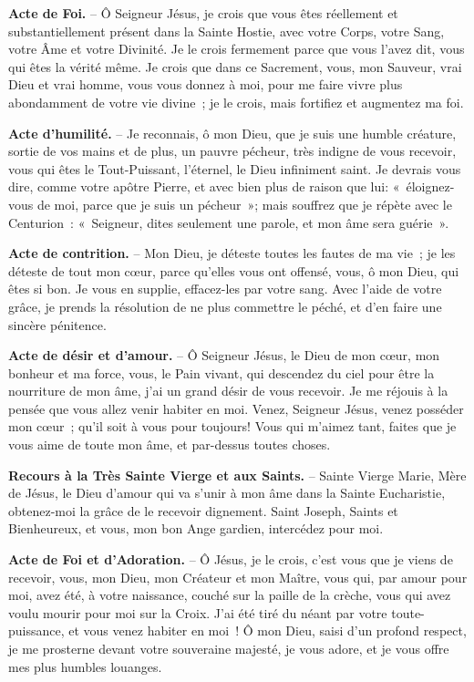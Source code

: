 \textbf{Acte de Foi.} – Ô Seigneur Jésus, je crois que vous êtes réellement et substantiellement présent dans la Sainte Hostie, avec votre Corps, votre Sang, votre Âme et votre Divinité. Je le crois fermement parce que vous l’avez dit, vous qui êtes la vérité même. Je crois que dans ce Sacrement, vous, mon Sauveur, vrai Dieu et vrai homme, vous vous donnez à moi, pour me faire vivre plus abondamment de votre vie divine~; je le crois, mais fortifiez et augmentez ma foi.

\textbf{Acte d’humilité.} – Je reconnais, ô mon Dieu, que je suis une humble créature, sortie de vos mains et de plus, un pauvre pécheur, très indigne de vous recevoir, vous qui êtes le Tout-Puissant, l’éternel, le Dieu infiniment saint. Je devrais vous dire, comme votre apôtre Pierre, et avec bien plus de raison que lui: «~éloignez-vous de moi, parce que je suis un pécheur~»; mais souffrez que je répète avec le Centurion~: «~Seigneur, dites seulement une parole, et mon âme sera guérie~».

\textbf{Acte de contrition.} – Mon Dieu, je déteste toutes les fautes de ma vie~; je les déteste de tout mon cœur, parce qu’elles vous ont offensé, vous, ô mon Dieu, qui êtes si bon. Je vous en supplie, effacez-les par votre sang. Avec l’aide de votre grâce, je prends la résolution de ne plus commettre le péché, et d’en faire une sincère pénitence.

\textbf{Acte de désir et d’amour.} – Ô Seigneur Jésus, le Dieu de mon cœur, mon bonheur et ma force, vous, le Pain vivant, qui descendez du ciel pour être la nourriture de mon âme, j’ai un grand désir de vous recevoir. Je me réjouis à la pensée que vous allez venir habiter en moi. Venez, Seigneur Jésus, venez posséder mon cœur~; qu’il soit à vous pour toujours! Vous qui m’aimez tant, faites que je vous aime de toute mon âme, et par-dessus toutes choses.

\textbf{Recours à la Très Sainte Vierge et aux Saints.} – Sainte Vierge Marie, Mère de Jésus, le Dieu d’amour qui va s’unir à mon âme dans la Sainte Eucharistie, obtenez-moi la grâce de le recevoir dignement. Saint Joseph, Saints et Bienheureux, et vous, mon bon Ange gardien, intercédez pour moi.\par\vspace{0.2cm}
\begin{center}\end{center}

\textbf{Acte de Foi et d’Adoration.} – Ô Jésus, je le crois, c’est vous que je viens de recevoir, vous, mon Dieu, mon Créateur et mon Maître, vous qui, par amour pour moi, avez été, à votre naissance, couché sur la paille de la crèche, vous qui avez voulu mourir pour moi sur la Croix. J’ai été tiré du néant par votre toute-puissance, et vous venez habiter en moi~! Ô mon Dieu, saisi d’un profond respect, je me prosterne devant votre souveraine majesté, je vous adore, et je vous offre mes plus humbles louanges.

